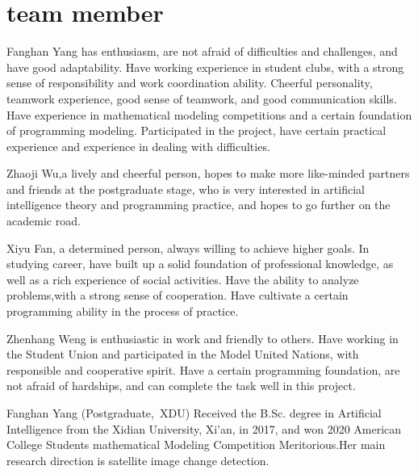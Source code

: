 \documentclass[journal]{IEEEtran}
\begin{document}
\section{team member}

Fanghan Yang has enthusiasm, are not afraid of difficulties and challenges, and have good adaptability. Have working experience in student clubs, with a strong sense of responsibility and work coordination ability. Cheerful personality, teamwork experience, good sense of teamwork, and good communication skills. Have experience in mathematical modeling competitions and a certain foundation of programming modeling. Participated in the project, have certain practical experience and experience in dealing with difficulties.

Zhaoji Wu,a lively and cheerful person, hopes to make more like-minded partners and friends at the postgraduate stage, who is very interested in artificial intelligence theory and programming practice, and hopes to go further on the academic road.

Xiyu Fan, a determined person, always willing to achieve higher goals.
In studying career, have built up a solid foundation of professional knowledge,
as well as a rich experience of social activities.
Have the ability to analyze problems,with a strong sense of cooperation.
Have cultivate a certain programming ability in the process of practice. 

Zhenhang Weng is enthusiastic in work and friendly to others. Have working in the Student Union and participated in the Model United Nations, with responsible and cooperative spirit. Have a certain programming foundation, are not afraid of hardships, and can complete the task well in this project.





\begin{IEEEbiography}{Fanghan Yang}
(Postgraduate,~XDU) Received the B.Sc. degree in Artificial Intelligence from the Xidian University, Xi'an, in 2017, and won 2020 American College Students mathematical Modeling Competition Meritorious.Her main research direction is satellite image change detection.

\end{IEEEbiography}
\end{document}
